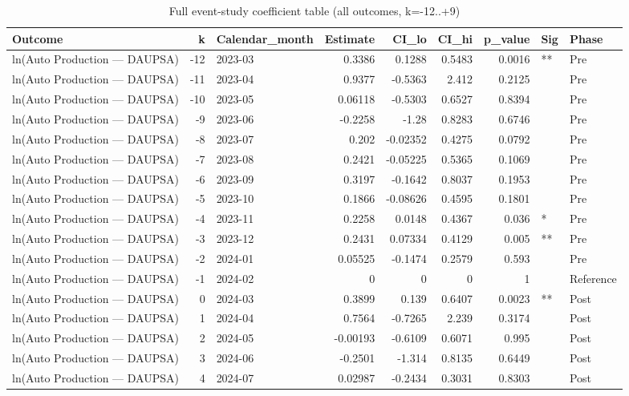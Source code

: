 \begin{table}
\caption{Full event-study coefficient table (all outcomes, k=-12..+9)}
\label{tab:tableS5_event_study_coefficients}
\begin{tabular}{lrlrrrrll}
\toprule
Outcome & k & Calendar\_month & Estimate & CI\_lo & CI\_hi & p\_value & Sig & Phase \\
\midrule
ln(Auto Production — DAUPSA) & -12 & 2023-03 & 0.3386 & 0.1288 & 0.5483 & 0.0016 & ** & Pre \\
ln(Auto Production — DAUPSA) & -11 & 2023-04 & 0.9377 & -0.5363 & 2.412 & 0.2125 &  & Pre \\
ln(Auto Production — DAUPSA) & -10 & 2023-05 & 0.06118 & -0.5303 & 0.6527 & 0.8394 &  & Pre \\
ln(Auto Production — DAUPSA) & -9 & 2023-06 & -0.2258 & -1.28 & 0.8283 & 0.6746 &  & Pre \\
ln(Auto Production — DAUPSA) & -8 & 2023-07 & 0.202 & -0.02352 & 0.4275 & 0.0792 &  & Pre \\
ln(Auto Production — DAUPSA) & -7 & 2023-08 & 0.2421 & -0.05225 & 0.5365 & 0.1069 &  & Pre \\
ln(Auto Production — DAUPSA) & -6 & 2023-09 & 0.3197 & -0.1642 & 0.8037 & 0.1953 &  & Pre \\
ln(Auto Production — DAUPSA) & -5 & 2023-10 & 0.1866 & -0.08626 & 0.4595 & 0.1801 &  & Pre \\
ln(Auto Production — DAUPSA) & -4 & 2023-11 & 0.2258 & 0.0148 & 0.4367 & 0.036 & * & Pre \\
ln(Auto Production — DAUPSA) & -3 & 2023-12 & 0.2431 & 0.07334 & 0.4129 & 0.005 & ** & Pre \\
ln(Auto Production — DAUPSA) & -2 & 2024-01 & 0.05525 & -0.1474 & 0.2579 & 0.593 &  & Pre \\
ln(Auto Production — DAUPSA) & -1 & 2024-02 & 0 & 0 & 0 & 1 &  & Reference \\
ln(Auto Production — DAUPSA) & 0 & 2024-03 & 0.3899 & 0.139 & 0.6407 & 0.0023 & ** & Post \\
ln(Auto Production — DAUPSA) & 1 & 2024-04 & 0.7564 & -0.7265 & 2.239 & 0.3174 &  & Post \\
ln(Auto Production — DAUPSA) & 2 & 2024-05 & -0.00193 & -0.6109 & 0.6071 & 0.995 &  & Post \\
ln(Auto Production — DAUPSA) & 3 & 2024-06 & -0.2501 & -1.314 & 0.8135 & 0.6449 &  & Post \\
ln(Auto Production — DAUPSA) & 4 & 2024-07 & 0.02987 & -0.2434 & 0.3031 & 0.8303 &  & Post \\

\end{tabular}
\end{table}

